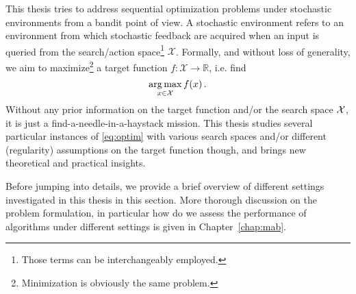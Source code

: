 This thesis tries to address sequential optimization problems under stochastic environments from a bandit point of view. A stochastic environment refers to an environment from which stochastic feedback are acquired when an input is queried from the search/action space\footnote{Those terms can be interchangeably employed.} $\mathcal{X}$. Formally, and without loss of generality, we aim to maximize\footnote{Minimization is obviously the same problem.} a target function $f:\mathcal{X}\rightarrow\mathbb{R}$, i.e. find 
\begin{equation}\label{eq:optim}
    \operatorname*{arg\,max}_{x\in\mathcal{X}} f(x)\,.
\end{equation}
Without any prior information on the target function and/or the search space $\mathcal{X}$, it is just a find-a-needle-in-a-haystack mission. This thesis studies several particular instances of \eqref{eq:optim} with various search spaces and/or different (regularity) assumptions on the target function though, and brings new theoretical and practical insights. 

Before jumping into details, we provide a brief overview of different settings investigated in this thesis in this section. More thorough discussion on the problem formulation, in particular how do we assess the performance of algorithms under different settings is given in Chapter~\ref{chap:mab}.



